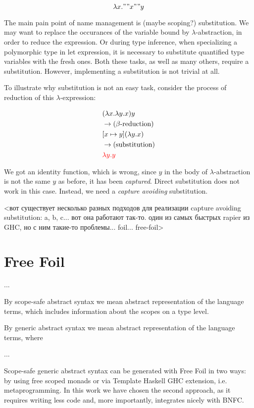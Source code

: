 $$
\lambda x." "x" "y
$$

The main pain point of name management is (maybe scoping?) substitution. We may want to replace the occurances of the variable bound by $\lambda$-abstraction, in order to reduce the expression. Or during type inference, when specializing a polymorphic type in let expression, it is necessary to substitute quantified type variables with the fresh ones. Both these tasks, as well as many others, require a substitution. However, implementing a substitution is not trivial at all.

To illustrate why substitution is not an easy task, consider the process of reduction of this $\lambda$-expression:

\begin{align*}
  & (\lambda x. \lambda y. x) y \\
  & \rightarrow \text{($\beta$-reduction)} \\
  & [x \mapsto y](\lambda y. x) \\
  & \rightarrow \text{(substitution)} \\
  & \textcolor{red}{\lambda y. y}
\end{align*}

We got an identity function, which is wrong, since $y$ in the body of $\lambda$-abstraction is not the same $y$ as before, it has been \textit{captured}. Direct substitution does not work in this case. Instead, we need a \textit{capture avoiding} substitution.

<вот существует несколько разных подходов для реализации capture avoiding substitution: a, b, c... вот она работают так-то. один из самых быстрых rapier из GHC, но с ним такие-то проблемы... foil... free-foil>

\section{Free Foil}

...

By scope-safe abstract syntax we mean abstract representation of the language terms, which includes information about the scopes on a type level.

By generic abstract syntax we mean abstract representation of the language terms, where 

...

Scope-safe generic abstract syntax can be generated with Free Foil in two ways: by using free scoped monads or via Template Haskell \cite{SheardPeytonJones2002_TH} GHC extension, i.e. metaprogramming. In this work we have chosen the second approach, as it requires writing less code and, more importantly, integrates nicely with BNFC.

